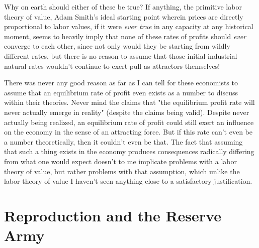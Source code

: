 \documentclass{article}
\theoremstyle{definition}
\theoremstyle{plain}
\theoremstyle{theorem}
\begin{document}
Why on earth should either of these be true? If anything, the primitive labor theory of value, Adam Smith's ideal starting point wherein prices are directly proportional to labor values, if it were \textit{ever true} in any capacity at any historical moment, seems to heavily imply that none of these rates of profits should \emph{ever} converge to each other, since not only would they be starting from wildly different rates, but there is no reason to assume that those initial industrial natural rates wouldn't continue to exert pull as attractors themselves! \par 
There was never any good reason as far as I can tell for these economists to assume that an equilibrium rate of profit even exists as a number to discuss within their theories. Never mind the claims that "the equilibrium profit rate will never actually emerge in reality" (despite the claims being valid). Despite never actually being realized, an equilibrium rate of profit could still exert an influence on the economy in the sense of an attracting force. But if this rate can't even be a number theoretically, then it couldn't even be that. The fact that assuming that such a thing exists in the economy produces consequences radically differing from what one would expect doesn't to me implicate problems with a labor theory of value, but rather problems with that assumption, which unlike the labor theory of value I haven't seen anything close to a satisfactory justification. 
\section{Reproduction and the Reserve Army}
\end{document}

